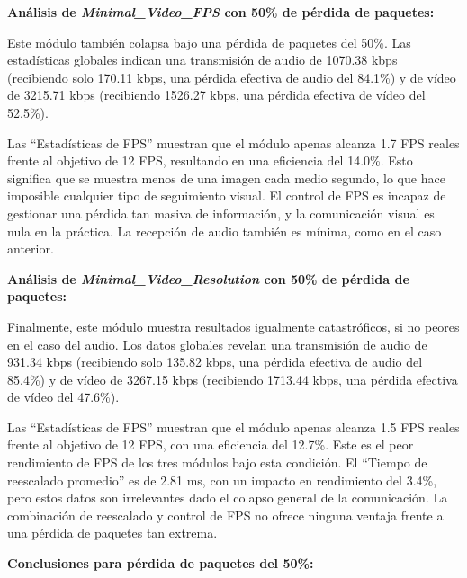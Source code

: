 \vspace{\baselineskip}

\textbf{Análisis de \textit{Minimal\_Video\_FPS} con 50\% de pérdida de paquetes:}
\vspace{\baselineskip}

Este módulo también colapsa bajo una pérdida de paquetes del 50\%. Las estadísticas globales indican una transmisión de audio de 1070.38 kbps (recibiendo solo 170.11 kbps, una pérdida efectiva de audio del 84.1\%) y de vídeo de 3215.71 kbps (recibiendo 1526.27 kbps, una pérdida efectiva de vídeo del 52.5\%).
\vspace{\baselineskip}

Las ``Estadísticas de FPS'' muestran que el módulo apenas alcanza 1.7 FPS reales frente al objetivo de 12 FPS, resultando en una eficiencia del 14.0\%. Esto significa que se muestra menos de una imagen cada medio segundo, lo que hace imposible cualquier tipo de seguimiento visual. El control de FPS es incapaz de gestionar una pérdida tan masiva de información, y la comunicación visual es nula en la práctica. La recepción de audio también es mínima, como en el caso anterior.

\vspace{\baselineskip}

\textbf{Análisis de \textit{Minimal\_Video\_Resolution} con 50\% de pérdida de paquetes:}
\vspace{\baselineskip}

Finalmente, este módulo muestra resultados igualmente catastróficos, si no peores en el caso del audio. Los datos globales revelan una transmisión de audio de 931.34 kbps (recibiendo solo 135.82 kbps, una pérdida efectiva de audio del 85.4\%) y de vídeo de 3267.15 kbps (recibiendo 1713.44 kbps, una pérdida efectiva de vídeo del 47.6\%).
\vspace{\baselineskip}

Las ``Estadísticas de FPS'' muestran que el módulo apenas alcanza 1.5 FPS reales frente al objetivo de 12 FPS, con una eficiencia del 12.7\%. Este es el peor rendimiento de FPS de los tres módulos bajo esta condición. El ``Tiempo de reescalado promedio'' es de 2.81 ms, con un impacto en rendimiento del 3.4\%, pero estos datos son irrelevantes dado el colapso general de la comunicación. La combinación de reescalado y control de FPS no ofrece ninguna ventaja frente a una pérdida de paquetes tan extrema.
\vspace{\baselineskip}

\textbf{Conclusiones para pérdida de paquetes del 50\%:}

